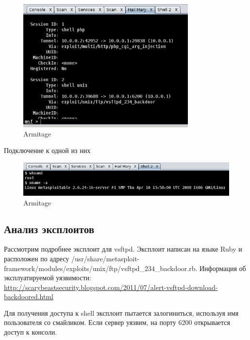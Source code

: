 \begin{figure}[H]
	\centering
	\includegraphics[width=0.8\textwidth]{figures/4.png}
	\caption{Armitage}
\end{figure}

Подключение к одной из них

\begin{figure}[H]
	\centering
	\includegraphics[width=\textwidth]{figures/5.png}
	\caption{Armitage}
\end{figure}

\subsection{Анализ эксплоитов}

Рассмотрим подробнее эксплоит для vsftpd. Эксплоит написан на языке Ruby и расположен по адресу /usr/share/metasploit-framework/modules/exploits/unix/ftp/vsftpd\_234\_backdoor.rb. Информация об эксплуатируемой уязвимости:
 \url{http://scarybeastsecurity.blogspot.com/2011/07/alert-vsftpd-download-backdoored.html}
 
Для получения доступа к shell эксплоит пытается залогиниться, используя имя пользователя со смайликом. Если сервер уязвим, на порту 6200 открывается доступ к консоли.

